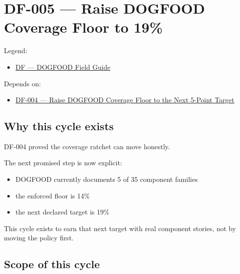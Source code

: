 \chapter{DF-005 --- Raise DOGFOOD Coverage Floor to 19\%}\label{record-067}

\smallskip

Legend:

\begin{itemize}
\tightlist
\item
  \href{https://github.com/flyingrobots/bijou/blob/1853ad902f6bf219326409e7f743a5a1d6517dbc/docs/legends/DF-dogfood-field-guide.md}{DF --- DOGFOOD Field Guide}
\end{itemize}

Depends on:

\begin{itemize}
\tightlist
\item
  \href{https://github.com/flyingrobots/bijou/blob/cbd70612140e7a450d764b3c7be1c6af878b99bc/docs/design/DF-004-raise-dogfood-coverage-floor-to-next-target.md}{DF-004 --- Raise DOGFOOD Coverage Floor to the Next 5-Point Target}
\end{itemize}

\section{Why this cycle exists}\label{record-067-why-this-cycle-exists}

DF-004 proved the coverage ratchet can move honestly.

The next promised step is now explicit:

\begin{itemize}
\tightlist
\item
  DOGFOOD currently documents 5 of 35 component families
\item
  the enforced floor is 14\%
\item
  the next declared target is 19\%
\end{itemize}

This cycle exists to earn that next target with real component stories, not by moving the policy first.

\section{Scope of this cycle}\label{record-067-scope-of-this-cycle}

